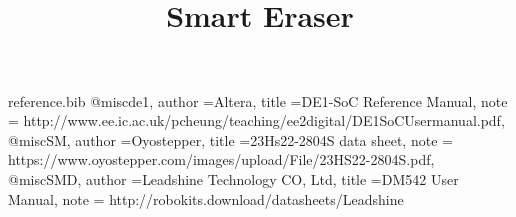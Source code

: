 %
\RequirePackage{filecontents}
\begin{filecontents*}{reference.bib}
	@misc{de1,
	author			={Altera},
	title			={{DE1-SoC Reference Manual}},
	note			=	{http://www.ee.ic.ac.uk/pcheung/teaching/ee2digital/DE1SoCUsermanual.pdf,
	}
}
	@misc{SM,
	author			={Oyostepper},
	title			={{23Hs22-2804S data sheet}},
	note			=	{https://www.oyostepper.com/images/upload/File/23HS22-2804S.pdf,
	}
}
	@misc{SMD,
	author			={Leadshine Technology CO, Ltd},
	title			={{DM542 User Manual}},
	note			=	{http://robokits.download/datasheets/Leadshine%
	}
}
\end{filecontents*}

\documentclass[12pt,onecolumn]{IEEEtran}			%
\usepackage{dtk-logos}						%
\usepackage{graphics}
\usepackage{float}
\usepackage{caption} 
\usepackage[export]{adjustbox}


\title{ \hfill  \vspace{2in} \\Smart Eraser \vspace{0.05in} }	

